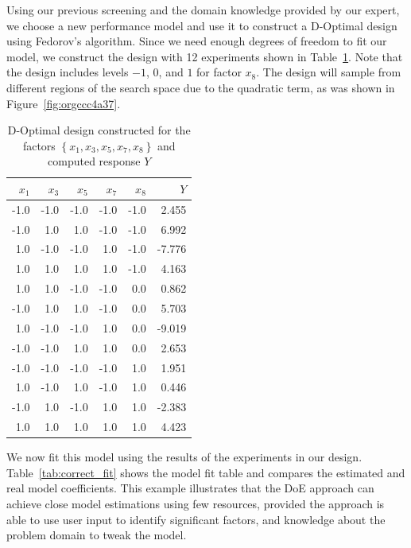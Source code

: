 \documentclass[conference]{IEEEtran}
\begin{document}
Using our previous screening and the domain knowledge provided by our expert, we
choose a new performance model and use  it to construct a D-Optimal design using
Fedorov's algorithm. Since  we need enough degrees of freedom  to fit our model,
we construct the  design with 12 experiments  shown in Table~\ref{tab:d_optimal}.
Note that  the design includes  levels \(-1\), \(0\), and  \(1\) for factor  \(x_8\). The
design  will sample  from  different regions  of  the search  space  due to  the
quadratic term, as was shown in Figure~\ref{fig:orgccc4a37}.

\begin{table}[t]
\centering
\caption{D-Optimal design constructed for the factors $\left\{x_1,x_3,x_5,x_7,x_8\right\}$ and computed response $Y$}
\label{tab:d_optimal}
\begingroup\footnotesize
\begin{tabular}{rrrrrr}
  \toprule
$x_1$ & $x_3$ & $x_5$ & $x_7$ & $x_8$ & $Y$ \\
  \midrule
-1.0 & -1.0 & -1.0 & -1.0 & -1.0 & 2.455 \\
  -1.0 & 1.0 & 1.0 & -1.0 & -1.0 & 6.992 \\
  1.0 & -1.0 & -1.0 & 1.0 & -1.0 & -7.776 \\
  1.0 & 1.0 & 1.0 & 1.0 & -1.0 & 4.163 \\
  1.0 & 1.0 & -1.0 & -1.0 & 0.0 & 0.862 \\
  -1.0 & 1.0 & 1.0 & -1.0 & 0.0 & 5.703 \\
  1.0 & -1.0 & -1.0 & 1.0 & 0.0 & -9.019 \\
  -1.0 & -1.0 & 1.0 & 1.0 & 0.0 & 2.653 \\
  -1.0 & -1.0 & -1.0 & -1.0 & 1.0 & 1.951 \\
  1.0 & -1.0 & 1.0 & -1.0 & 1.0 & 0.446 \\
  -1.0 & 1.0 & -1.0 & 1.0 & 1.0 & -2.383 \\
  1.0 & 1.0 & 1.0 & 1.0 & 1.0 & 4.423 \\
   \bottomrule
\end{tabular}
\endgroup
\end{table}

We  now fit  this model  using the  results of  the experiments  in our  design.
Table~\ref{tab:correct_fit} shows the model fit  table and compares the estimated
and real model coefficients. This example  illustrates that the DoE approach can
achieve close  model estimations using  few resources, provided the  approach is
able to use user input to  identify significant factors, and knowledge about the
problem domain to tweak the model.
\end{document}
